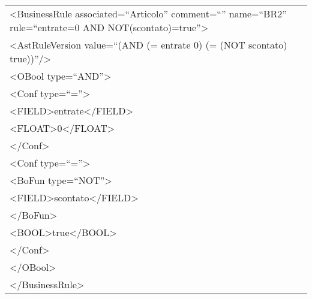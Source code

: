 \begin{center}
\begin{tabular}{|p{11cm}|} \hline
\textless BusinessRule associated=``Articolo'' comment=``'' name=``BR2'' rule=``entrate=0 AND NOT(scontato)=true''\textgreater \\
\textless AstRuleVersion value=``(AND (= entrate 0) (= (NOT scontato) true))''/\textgreater \\
 \textless OBool type=``AND''\textgreater \\
 \textless Conf type=``=''\textgreater \\
 \textless FIELD\textgreater entrate\textless /FIELD\textgreater \\
 \textless FLOAT\textgreater 0\textless /FLOAT\textgreater \\
 \textless /Conf\textgreater \\
 \textless Conf type=``=''\textgreater \\
\textless BoFun type=``NOT''\textgreater \\
 \textless FIELD\textgreater scontato\textless /FIELD\textgreater \\
\textless /BoFun\textgreater \\
 \textless BOOL\textgreater true\textless /BOOL\textgreater \\
\textless /Conf\textgreater \\
\textless /OBool\textgreater \\
\textless /BusinessRule\textgreater \\ \hline
\end{tabular} \\
\end{center}

